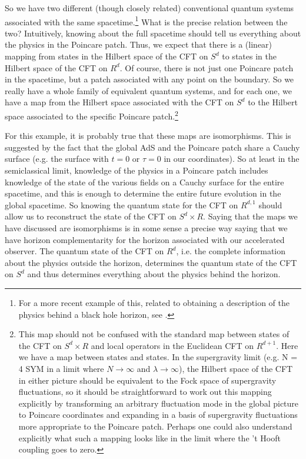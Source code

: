 \documentclass[12pt,epsf]{article}
\renewcommand{\(}{\left(}
\renewcommand{\)}{\right)}
\begin{document}
So we have two different (though closely related) conventional quantum systems associated with the same spacetime.\footnote{For a more recent example of this, related to obtaining a description of the physics behind a black hole horizon, see \cite{hls}.} What is the precise relation between the two? Intuitively, knowing about the full spacetime should tell us everything about the physics in the Poincare patch. Thus, we expect that there is a (linear) mapping from states in the Hilbert space of the CFT on $S^d$ to states in the Hilbert space of the CFT on $R^d$. Of course, there is not just one Poincare patch in the spacetime, but a patch associated with any point on the boundary. So we really have a whole family of equivalent quantum systems, and for each one, we have a map from the Hilbert space associated with the CFT on $S^d$ to the Hilbert space associated to the specific Poincare patch.\footnote{This map should not be confused with the standard map between states of the CFT on $S^d \times R$ and local operators in the Euclidean CFT on $R^{d+1}$. Here we have a map between states and states. In the supergravity limit (e.g. {\cal N = 4} SYM in a limit where $N \to \infty$ and $\lambda \to \infty$), the Hilbert space of the CFT in either picture should be equivalent to the Fock space of supergravity fluctuations, so it should be straightforward to work out this mapping explicitly by transforming an arbitrary fluctuation mode in the global picture to Poincare coordinates and expanding in a basis of supergravity fluctuations more appropriate to the Poincare patch. Perhaps one could also understand explicitly what such a mapping looks like in the limit where the 't Hooft coupling goes to zero.}

For this example, it is probably true that these maps are isomorphisms. This is suggested by the fact that the global AdS and the Poincare patch share a Cauchy surface (e.g. the surface with $t=0$ or $\tau=0$ in our coordinates). So at least in the semiclassical limit, knowledge of the physics in a Poincare patch includes knowledge of the state of the various fields on a Cauchy surface for the entire spacetime, and this is enough to determine the entire future evolution in the global spacetime. So knowing the quantum state for the CFT on $R^{d,1}$ should allow us to reconstruct the state of the CFT on $S^d \times R$. Saying that the maps we have discussed are isomorphisms is in some sense a precise way saying that we have horizon complementarity \cite{stu} for the horizon associated with our accelerated observer. The quantum state of the CFT on $R^d$, i.e. the complete information about the physics outside the horizon, determines the quantum state of the CFT on $S^d$ and thus determines everything about the physics behind the horizon.
\end{document}
